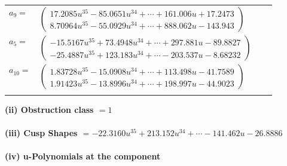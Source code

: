 \documentclass[1p]{elsarticle_modified}
\theoremstyle{definition}
\begin{document}
\begin{tabular}{m{7pt} m{180pt} m{7pt} m{180pt} }
\flushright $a_{9}=$&$\begin{pmatrix}17.2085 u^{35}-85.0651 u^{34}+\cdots+161.006 u+17.2473\\8.70964 u^{35}-55.0929 u^{34}+\cdots+888.062 u-143.943\end{pmatrix}$ \\
\flushright $a_{5}=$&$\begin{pmatrix}-15.5167 u^{35}+73.4948 u^{34}+\cdots+297.881 u-89.8827\\-25.4887 u^{35}+123.183 u^{34}+\cdots-203.537 u-8.68232\end{pmatrix}$ \\
\flushright $a_{10}=$&$\begin{pmatrix}1.83728 u^{35}-15.0908 u^{34}+\cdots+113.498 u-41.7589\\1.91423 u^{35}-13.8996 u^{34}+\cdots+198.997 u-44.9023\end{pmatrix}$\\&\end{tabular}
\flushleft \textbf{(ii) Obstruction class $= 1$}\\~\\
\flushleft \textbf{(iii) Cusp Shapes $= -22.3160 u^{35}+213.152 u^{34}+\cdots-141.462 u-26.8886$}\\~\\
\newpage\renewcommand{\arraystretch}{1}
\flushleft \textbf{(iv) u-Polynomials at the component}\newline \\
\end{document}
